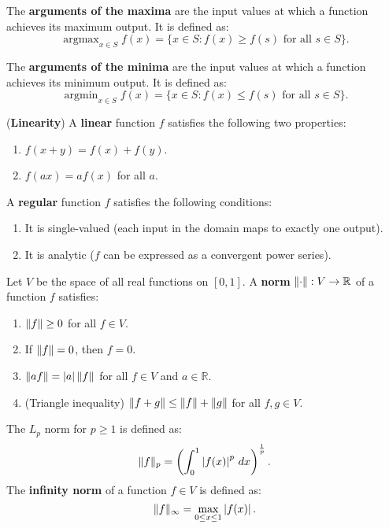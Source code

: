 \documentclass{huhtakm-template-book}
\DeclareMathOperator*{\argmin}{argmin}
\DeclareMathOperator*{\argmax}{argmax}
\begin{document}
    \begin{defn}
        The \textbf{arguments of the maxima} are the input values at which a function achieves its maximum output. It is defined as:
        \begin{equation*}
            \argmax_{x\in S}f(x)=\{x\in S:f(x)\geq f(s)\text{ for all }s\in S\}.
        \end{equation*}
    \end{defn}
    \begin{defn}
        The \textbf{arguments of the minima} are the input values at which a function achieves its minimum output. It is defined as:
        \begin{equation*}
            \argmin_{x\in S}f(x)=\{x\in S:f(x)\leq f(s)\text{ for all }s\in S\}.
        \end{equation*}
    \end{defn}
    \begin{defn}(\textbf{Linearity})
        A \textbf{linear} function $f$ satisfies the following two properties:
        \begin{enumerate}
            \item $f(x+y)=f(x)+f(y)$.
            \item $f(ax)=af(x)$ for all $a$.
        \end{enumerate}
    \end{defn}
    \begin{defn}
        A \textbf{regular} function $f$ satisfies the following conditions:
        \begin{enumerate}
            \item It is single-valued (each input in the domain maps to exactly one output).
            \item It is analytic ($f$ can be expressed as a convergent power series).
        \end{enumerate}
    \end{defn}
    \begin{defn}
        Let $V$ be the space of all real functions on $[0,1]$. A \textbf{norm} $\lVert{\cdot}\rVert:V\to\mathbb{R}$ of a function $f$ satisfies:
        \begin{enumerate}
            \item $\lVert{f}\rVert\geq 0$ for all $f\in V$.
            \item If $\lVert{f}\rVert=0$, then $f=0$.
            \item $\lVert{af}\rVert=\left|{a}\right|\lVert{f}\rVert$ for all $f\in V$ and $a\in\mathbb{R}$.
            \item (Triangle inequality) $\lVert{f+g}\rVert\leq\lVert{f}\rVert+\lVert{g}\rVert$ for all $f,g\in V$.
        \end{enumerate}
        The $L_{p}$ norm for $p\geq 1$ is defined as:
        \begin{equation*}
            \lVert{f}\rVert_{p}=\left(\int_{0}^{1}\left|{f(x)}\right|^{p}\,dx\right)^{\frac{1}{p}}.
        \end{equation*}
        The \textbf{infinity norm} of a function $f\in V$ is defined as:
        \begin{equation*}
            \lVert{f}\rVert_{\infty}=\max_{0\leq x\leq 1}\left|{f(x)}\right|.
        \end{equation*}
    \end{defn}
\end{document}
